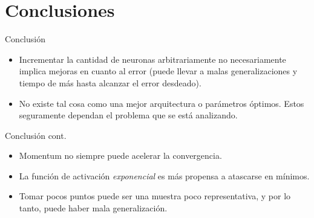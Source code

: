 \documentclass{beamer}
\begin{document}
\section{Conclusiones}
\begin{frame}{Conclusión}

\begin{itemize}
\item Incrementar la cantidad de neuronas arbitrariamente no necesariamente 
implica mejoras en cuanto al error (puede llevar a malas generalizaciones y tiempo de más 
hasta alcanzar el error desdeado).\\
\item No existe tal cosa como una mejor arquitectura o parámetros óptimos. Estos seguramente dependan 
el problema que se está analizando.\\
\end{itemize}

\end{frame}

\begin{frame}{Conclusión cont.}
\begin{itemize}

\item Momentum no siempre puede acelerar la convergencia.\\
\item La función de activación \textit{exponencial} es más propensa a atascarse en mínimos.\\
\item Tomar pocos puntos puede ser una muestra poco representativa, y por lo tanto, puede haber mala generalización.\\
\end{itemize}
\end{frame}
\end{document}
